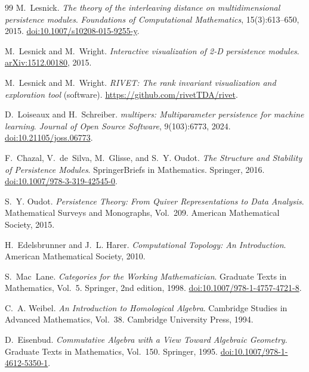 \documentclass[11pt]{article}
\theoremstyle{definition}
\theoremstyle{remark}
\begin{document}
\begin{thebibliography}{99}
M.~Lesnick.
\newblock \emph{The theory of the interleaving distance on multidimensional persistence modules}.
\newblock \emph{Foundations of Computational Mathematics}, 15(3):613--650, 2015.
\newblock \href{https://doi.org/10.1007/s10208-015-9255-y}{doi:10.1007/s10208-015-9255-y}.

M.~Lesnick and M.~Wright.
\newblock \emph{Interactive visualization of 2-D persistence modules}.
\newblock \href{https://arxiv.org/abs/1512.00180}{arXiv:1512.00180}, 2015.

M.~Lesnick and M.~Wright.
\newblock \emph{RIVET: The rank invariant visualization and exploration tool} (software).
\newblock \url{https://github.com/rivetTDA/rivet}.

D.~Loiseaux and H.~Schreiber.
\newblock \emph{multipers: Multiparameter persistence for machine learning}.
\newblock \emph{Journal of Open Source Software}, 9(103):6773, 2024.
\newblock \href{https://doi.org/10.21105/joss.06773}{doi:10.21105/joss.06773}.

F.~Chazal, V.~de~Silva, M.~Glisse, and S.~Y. Oudot.
\newblock \emph{The Structure and Stability of Persistence Modules}.
\newblock SpringerBriefs in Mathematics. Springer, 2016.
\newblock \href{https://doi.org/10.1007/978-3-319-42545-0}{doi:10.1007/978-3-319-42545-0}.

S.~Y. Oudot.
\newblock \emph{Persistence Theory: From Quiver Representations to Data Analysis}.
\newblock Mathematical Surveys and Monographs, Vol.~209. American Mathematical Society, 2015.

H.~Edelsbrunner and J.~L. Harer.
\newblock \emph{Computational Topology: An Introduction}.
\newblock American Mathematical Society, 2010.

S.~Mac~Lane.
\newblock \emph{Categories for the Working Mathematician}.
\newblock Graduate Texts in Mathematics, Vol.~5. Springer, 2nd edition, 1998.
\newblock \href{https://doi.org/10.1007/978-1-4757-4721-8}{doi:10.1007/978-1-4757-4721-8}.

C.~A. Weibel.
\newblock \emph{An Introduction to Homological Algebra}.
\newblock Cambridge Studies in Advanced Mathematics, Vol.~38. Cambridge University Press, 1994.

D.~Eisenbud.
\newblock \emph{Commutative Algebra with a View Toward Algebraic Geometry}.
\newblock Graduate Texts in Mathematics, Vol.~150. Springer, 1995.
\newblock \href{https://doi.org/10.1007/978-1-4612-5350-1}{doi:10.1007/978-1-4612-5350-1}.


\end{thebibliography}
\end{document}
